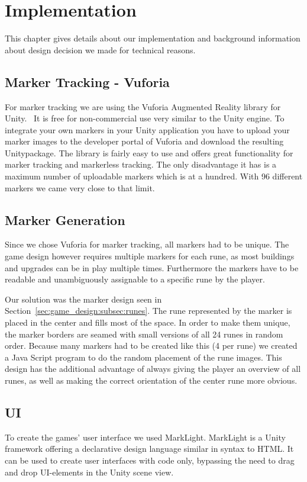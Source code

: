 \section{Implementation}
This chapter gives details about our implementation and background information about design decision we made for technical reasons.

\subsection{Marker Tracking - Vuforia}

For marker tracking we are using the Vuforia Augmented Reality library for Unity.~\cite{vuforia} It is free for non-commercial use very similar to the Unity engine. To integrate your own markers in your Unity application you have to upload your marker images to the developer portal of Vuforia and download the resulting Unitypackage. 
The library is fairly easy to use and offers great functionality for marker tracking and markerless tracking. The only disadvantage it has is a maximum number of uploadable markers which is at a hundred. With 96 different markers we came very close to that limit.

\subsection{Marker Generation}
\label{sec:implementation:marker_generation}
Since we chose Vuforia for marker tracking, all markers had to be unique. The game design however requires multiple markers for each rune, as most buildings and upgrades can be in play multiple times. Furthermore the markers have to be readable and unambiguously assignable to a specific rune by the player.

Our solution was the marker design seen in Section~\ref{sec:game_design:subsec:runes}. The rune represented by the marker is placed in the center and fills most of the space. In order to make them unique, the marker borders are seamed with small versions of all 24 runes in random order. Because many markers had to be created like this (4 per rune) we created a Java Script program to do the random placement of the rune images. This design has the additional advantage of always giving the player an overview of all runes, as well as making the correct orientation of the center rune more obvious.

\subsection{UI}
To create the games' user interface we used MarkLight.\cite{marklight} MarkLight is a Unity framework offering a declarative design language similar in syntax to HTML. It can be used to create user interfaces with code only, bypassing the need to drag and drop UI-elements in the Unity scene view.

